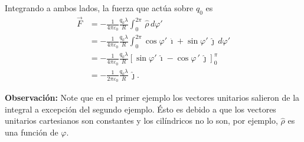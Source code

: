 \begin{ejemplo}
Integrando a ambos lados, la fuerza que actúa sobre $q_0$ es
\begin{align*}
\Vec{F} &=   - \frac{1}{4\pi \varepsilon_0} \frac{q_0 \lambda}{R}  \int_0^{2\pi}  \,\hat{\rho} \,d\varphi' \\
&= - \frac{1}{4\pi \varepsilon_0} \frac{q_0 \lambda}{R}  \int_0^{2\pi} \cos \varphi ' \,\hat{\imath} + \sin \varphi  '\,\hat{\jmath} \,d\varphi' \\
&= - \frac{1}{4\pi \varepsilon_0} \frac{q_0 \lambda}{R}  \left[\sin \varphi' \, \hat{\imath} - \cos \varphi\,' \,\hat{\jmath} \right]_0^{\pi} \\
&= - \frac{1}{2\pi \varepsilon_0} \frac{q_0 \lambda}{R} \, \hat{\jmath}.
\end{align*}
\end{ejemplo}

\textbf{Observación:} Note que en el primer ejemplo los vectores unitarios salieron de la integral a excepción del segundo ejemplo. Ésto es debido a que los vectores unitarios cartesianos son constantes y los cilíndricos no lo son, por ejemplo, $\hat{\rho}$ es una función de $\varphi$.

